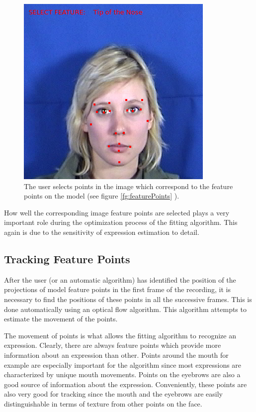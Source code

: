 \documentclass[11pt,a4paper,twoside]{report}
\begin{document}
\begin{figure}[H]
\begin{centering}
\includegraphics[scale=0.70]{images/featureSelection.png}
\par\end{centering}

\caption{The user selects points in the image which correspond to the feature
  points on the model (see figure \ref{fg:featurePoints} ).}
\label{fg:featurePoints2}

\end{figure}

How well the corresponding image feature points are selected plays a very important role
during the optimization process of the fitting algorithm. This again is due to the
sensitivity of expression estimation to detail.

\subsection{Tracking Feature Points}
After the user (or an automatic algorithm) has identified the position of the projections of model
feature points in the first frame of the recording, it is necessary to find
the positions of these points in all the successive frames. This is done
automatically using an optical flow algorithm. This algorithm attempts to
estimate the movement of the points.

The movement of points is what allows the fitting algorithm to recognize an
expression. Clearly, there are always feature points which provide more information about an
expression than
other. Points around the mouth for example are especially important for the
algorithm since most expressions are characterized by unique mouth
movements. Points on the eyebrows are also a good source of information about
the expression. Conveniently, these points are also very good for tracking since
the mouth and the eyebrows are easily distinguishable in terms of texture from
other points on the face. 
\end{document}

